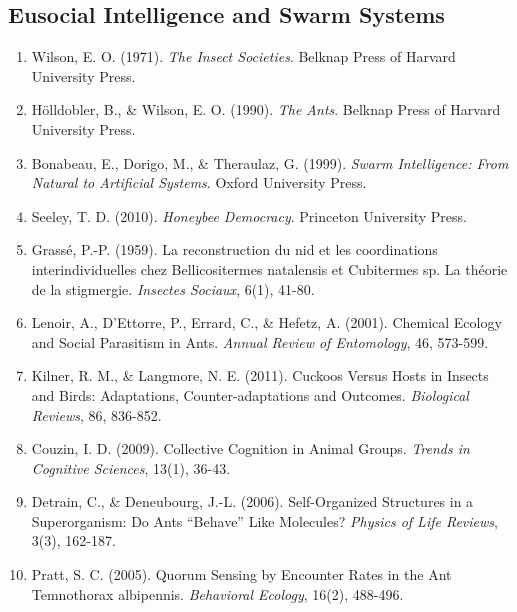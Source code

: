 \documentclass[
]{article}
\begin{document}
\subsection{Eusocial Intelligence and Swarm
Systems}\label{eusocial-intelligence-and-swarm-systems}

\begin{enumerate}
\def\labelenumi{\arabic{enumi}.}
\item
  Wilson, E. O. (1971). \emph{The Insect Societies}. Belknap Press of
  Harvard University Press.
\item
  Hölldobler, B., \& Wilson, E. O. (1990). \emph{The Ants}. Belknap
  Press of Harvard University Press.
\item
  Bonabeau, E., Dorigo, M., \& Theraulaz, G. (1999). \emph{Swarm
  Intelligence: From Natural to Artificial Systems}. Oxford University
  Press.
\item
  Seeley, T. D. (2010). \emph{Honeybee Democracy}. Princeton University
  Press.
\item
  Grassé, P.-P. (1959). La reconstruction du nid et les coordinations
  interindividuelles chez Bellicositermes natalensis et Cubitermes sp.
  La théorie de la stigmergie. \emph{Insectes Sociaux}, 6(1), 41-80.
\item
  Lenoir, A., D'Ettorre, P., Errard, C., \& Hefetz, A. (2001). Chemical
  Ecology and Social Parasitism in Ants. \emph{Annual Review of
  Entomology}, 46, 573-599.
\item
  Kilner, R. M., \& Langmore, N. E. (2011). Cuckoos Versus Hosts in
  Insects and Birds: Adaptations, Counter-adaptations and Outcomes.
  \emph{Biological Reviews}, 86, 836-852.
\item
  Couzin, I. D. (2009). Collective Cognition in Animal Groups.
  \emph{Trends in Cognitive Sciences}, 13(1), 36-43.
\item
  Detrain, C., \& Deneubourg, J.-L. (2006). Self-Organized Structures in
  a Superorganism: Do Ants ``Behave'' Like Molecules? \emph{Physics of
  Life Reviews}, 3(3), 162-187.
\item
  Pratt, S. C. (2005). Quorum Sensing by Encounter Rates in the Ant
  Temnothorax albipennis. \emph{Behavioral Ecology}, 16(2), 488-496.
\end{enumerate}



\providecommand{\bibsection}{}
\renewcommand{\bibsection}{}


\end{document}
